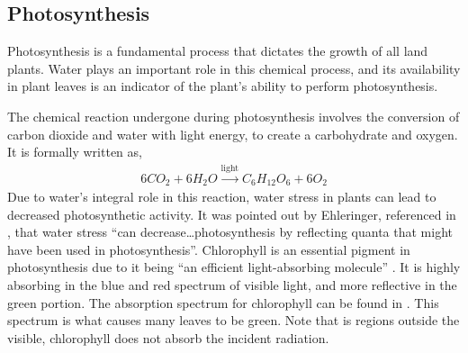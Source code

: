 \subsection{Photosynthesis}

Photosynthesis is a fundamental process that dictates the growth of all land plants.  Water plays an important role in this chemical process, and its availability in plant leaves is an indicator of the plant's ability to perform photosynthesis.

The chemical reaction undergone during photosynthesis involves the conversion of carbon dioxide and water with light energy, to create a carbohydrate and oxygen.  It is formally written as,
%
\begin{align}
    6CO_2 + 6H_2O \xrightarrow{\text{light}} C_6H_12O_6 + 6O_2
\end{align}
%
Due to water's integral role in this reaction, water stress in plants can lead to decreased photosynthetic activity.  It was pointed out by Ehleringer, referenced in \cite{akinci}, that water stress “can decrease…photosynthesis by reflecting quanta that might have been used in photosynthesis”.   Chlorophyll is an essential pigment in photosynthesis due to it being “an efficient light-absorbing molecule” \cite{ecophysiology}.  It is highly absorbing in the blue and red spectrum of visible light, and more reflective in the green portion.  The absorption spectrum for chlorophyll can be found in \cite{chemistry}. This spectrum is what causes many leaves to be green.  Note that is regions outside the visible, chlorophyll does not absorb the incident radiation.
